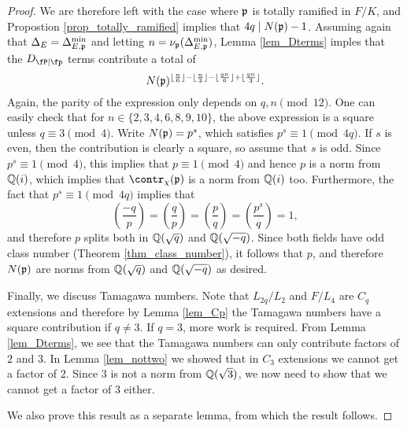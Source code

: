 \begin{proof}
    We are therefore left with the case where $\mathfrak{p}$ is totally ramified in $F/K$, and Propostion \ref{prop_totally_ramified} implies that $4q\mid N(\mathfrak{p})-1$. Assuming again that $\Delta_E=\Delta_{E,\mathfrak{p}}^{\min}$ and letting $n=\nu_{\mathfrak{p}}(\Delta_{E,\mathfrak{p}}^{\min})$, Lemma \ref{lem_Dterms} imples that the $D_{\fP\mid\fp}$ terms contribute a total of 
    $$N(\mathfrak{p})^{\lfloor\frac{n}{6}\rfloor-\lfloor\frac{n}{3}\rfloor-\lfloor\frac{qn}{6}\rfloor+\lfloor\frac{qn}{3}\rfloor}.$$
    Again, the parity of the expression only depends on $q,n\pmod{12}$. One can easily check that for $n\in\{2,3,4,6,8,9,10\}$, the above expression is a square unless $q\equiv 3\pmod{4}$. Write $N(\mathfrak{p})=p^s$, which satisfies $p^s\equiv1\pmod{4q}$. If $s$ is even, then the contribution is clearly a square, so assume that $s$ is odd. Since $p^s\equiv1\pmod{4}$, this implies that $p\equiv1\pmod{4}$ and hence $p$ is a norm from $\mathbb{Q}(i)$, which implies that $\contr_\chi(\pp)$ is a norm from $\mathbb{Q}(i)$ too. Furthermore, the fact that $p^s\equiv1\pmod{4q}$ implies that
    $$\left(\frac{-q}{p}\right)=\left(\frac{q}{p}\right)=\left(\frac{p}{q}\right)=\left(\frac{p^s}{q}\right)=1,$$
    and therefore $p$ splits both in $\mathbb{Q}(\sqrt{q})$ and $\mathbb{Q}(\sqrt{-q})$. Since both fields have odd class number (Theorem \ref{thm_class_number}), it follows that $p$, and therefore $N(\mathfrak{p})$ are norms from $\mathbb{Q}(\sqrt{q})$ and $\mathbb{Q}(\sqrt{-q})$ as desired. 

    Finally, we discuss Tamagawa numbers. Note that $L_{2q}/L_2$ and $F/L_4$ are $C_q$ extensions and therefore by Lemma \ref{lem_Cp} the Tamagawa numbers have a square contribution if $q\neq3$. If $q=3$, more work is required. From Lemma \ref{lem_Dterms}, we see that the Tamagawa numbers can only contribute factors of $2$ and $3$. In Lemma \ref{lem_nottwo} we showed that in $C_3$ extensions we cannot get a factor of $2$. Since $3$ is not a norm from $\mathbb{Q}(\sqrt{3})$, we now need to show that we cannot get a factor of $3$ either. 
    
    We also prove this result as a separate lemma, from which the result follows.

    
\end{proof}


